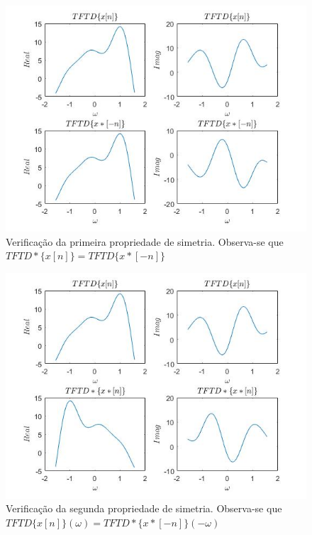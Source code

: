 \documentclass[a4paper, 12pt]{article}
\begin{document}
\begin{figure}[H]
	\centering
	\includegraphics[scale=0.7]{img2.jpg} 
	\caption{Verificação da primeira propriedade de simetria. Observa-se que $TFTD*\lbrace x[n]\rbrace = TFTD\lbrace x*[-n]\rbrace$}
	\label{fig:2}
\end{figure}

\begin{figure}[H]
	\centering
	\includegraphics[scale=0.7]{img3.jpg} 
	\caption{Verificação da segunda propriedade de simetria. Observa-se que $TFTD\lbrace x[n]\rbrace (\omega ) = TFTD*\lbrace x*[-n]\rbrace (-\omega )$}
	\label{fig:3}
\end{figure}
\end{document}
